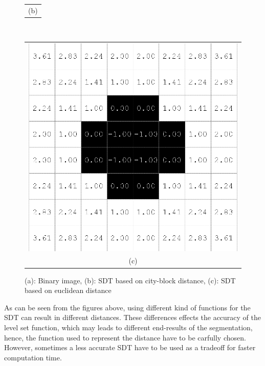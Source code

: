 \begin{figure}[h!]
\begin{minipage}{.45\textwidth}
\begin{tabular}{c}
(b)
\end{tabular}
\end{minipage}
\\
\begin{tabular}{c}
\includegraphics[width=.5\textwidth]{backgroundTheory/levelset/euclidean} \\
(c)
\end{tabular}
\caption{(a): Binary image, (b): SDT based on city-block distance, (c): SDT based on euclidean distance}
\label{SDT}
\end{figure}

As can be seen from the figures above, using different kind of functions for the SDT can result in different distances. These differences effects the accuracy of the level set function, which may leads to different end-results of the segmentation, hence, the function used to represent the distance have to be carfully chosen. However, sometimes a less accurate SDT have to be used as a tradeoff for faster computation time.


